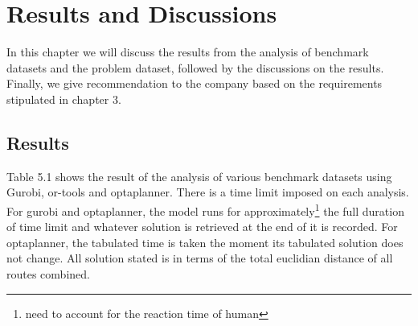 \chapter{Results and Discussions}
In this chapter we will discuss the results from the analysis of benchmark datasets and the problem dataset, followed
by the discussions on the results. Finally, we give recommendation to the company based on the requirements stipulated
in chapter 3.

\section{Results}
Table 5.1 shows the result of the analysis of various benchmark datasets using Gurobi, or-tools and optaplanner. There is
a time limit imposed on each analysis. For gurobi and optaplanner, the model runs for approximately\footnote{need to account for the reaction
time of human} the full duration of time limit and whatever solution is retrieved at the end of it is recorded. For optaplanner, the tabulated
time is taken the moment its tabulated solution does not change. All solution stated is in terms of the total euclidian distance
of all routes combined.
